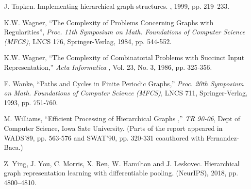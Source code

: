 \begin{thebibliography}{HMRR93}
J. Tapken. 
\newblock Implementing hierarchical graph-structures.
,
1999, pp. 219--233.

  K.W. Wagner,
``The  Complexity of Problems Concerning Graphs with Regularities'',
{\em Proc. 11th Symposium on Math. Foundations of Computer Science (MFCS)},
LNCS 176, Springer-Verlag, 1984, pp. 544-552.


 K.W. Wagner,
``The Complexity of Combinatorial Problems with Succinct 
Input Representation,''
{\em Acta Informatica }, Vol. 23, No. 3, 1986, pp. 325-356.



  E.  Wanke,
``Paths and Cycles in Finite Periodic Graphs,''
{\em Proc. 20th Symposium on Math. Foundations of Computer Science (MFCS)},
LNCS 711, Springer-Verlag, 1993, pp. 751-760.
	
 M. Williams,
``Efficient Processing of  Hierarchical Graphs ,''
 {\em TR 90-06}, Dept of Computer Science, Iowa Sate University. 
(Parts of the report appeared in WADS'89, pp. 563-576
and SWAT'90, pp. 320-331 coauthored with 
Fernandez-Baca.)

Z. Ying, J. You, C. Morris, X. Ren, W. Hamilton and J. Leskovec.
\newblock  Hierarchical graph representation learning with differentiable pooling.
 (NeurIPS),
2018, pp. 4800--4810.

\end{thebibliography}
